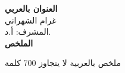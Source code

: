 \documentclass[12pt,a4paper,oneside]{report}
\begin{document}

\begin{center}

{\Large\bfseries
العنوان بالعربي
}\\[0.5cm]

{\large  غرام الشهراني}\\[0.2cm]

{\normalsize
المشرف: أ.د.
} \\[0.7cm]

{\large\bfseries الملخص}


\end{center}

\vspace{0.1cm}


\noindent

ملخص بالعربية لا يتجاوز 700 كلمة  
\end{document}
